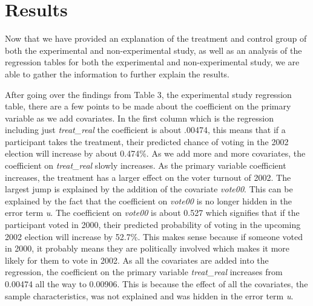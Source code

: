 \documentclass[a4paper]{article}
\begin{document}
\section{Results}

Now that we have provided an explanation of the treatment and control group of both the experimental and non-experimental study, as well as an analysis of the regression tables for both the experimental and non-experimental study, we are able to gather the information to further explain the results. 

\begin{flushleft}
After going over the findings from Table 3, the experimental study regression table, there are a few points to be made about the coefficient on the primary variable as we add covariates. In the first column which is the regression including just \textit{treat\_real} the coefficient is about .00474, this means that if a participant takes the treatment, their predicted chance of voting in the 2002 election will increase by about 0.474\%. As we add more and more covariates, the coefficient on \textit{treat\_real} slowly increases. As the primary variable coefficient increases, the treatment has a larger effect on the voter turnout of 2002. The largest jump is explained by the addition of the covariate \textit{vote00}. This can be explained by the fact that the coefficient on \textit{vote00} is no longer hidden in the error term \textit{u}. The coefficient on \textit{vote00} is about 0.527 which signifies that if the participant voted in 2000, their predicted probability of voting in the upcoming 2002 election will increase by 52.7\%. This makes sense because if someone voted in 2000, it probably means they are politically involved which makes it more likely for them to vote in 2002. As all the covariates are added into the regression, the coefficient on the primary variable \textit{treat\_real} increases from 0.00474 all the way to 0.00906. This is because the effect of all the covariates, the sample characteristics, was not explained and was hidden in the error term \textit{u}. 
\end{flushleft}
\end{document}
